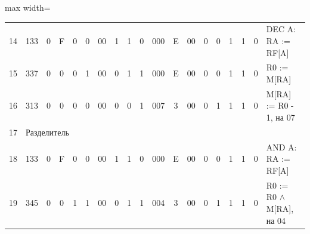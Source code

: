 \documentclass[11pt, a4paper]{article}
\begin{document}
{\begin{table}[h!]
\begin{adjustbox}{max width=\textwidth}
\begin{tabular}{|c|c|c|c|c|c|c|c|c|c|c|c|c|c|c|c|c|c|l|}
				14          & 133                               & 0                                 & F                                      & 0                                      & 0             & 00          & 1                                       & 1                                     & 0                    & 000            & E             & 00         & 0          & 0            & 1           & 1            & 0           & DEC A: RA := RF[A]             \\
				15          & 337                               & 0                                 & 0                                      & 0                                      & 1             & 00          & 0                                       & 1                                     & 1                    & 000            & E             & 00         & 0          & 0            & 1           & 1            & 0           & R0 := M[RA]                    \\
				16          & 313                               & 0                                 & 0                                      & 0                                      & 0             & 00          & 0                                       & 0                                     & 1                    & 007            & 3             & 00         & 0          & 1            & 1           & 1            & 0           & M[RA] := R0 - 1, на 07         \\
				17          & \multicolumn{18}{l|}{Разделитель}                                                                                                                                                                                                                                                                                                                                                                                                                    \\
				18          & 133                               & 0                                 & F                                      & 0                                      & 0             & 00          & 1                                       & 1                                     & 0                    & 000            & E             & 00         & 0          & 0            & 1           & 1            & 0           & AND A: RA := RF[A]             \\
				19          & 345                               & 0                                 & 0                                      & 1                                      & 1             & 00          & 0                                       & 1                                     & 1                    & 004            & 3             & 00         & 0          & 1            & 1           & 1            & 0           & R0 := R0 $\wedge$ M[RA], на 04 \\

\end{tabular}
\end{adjustbox}
\end{table}}
\end{document}
